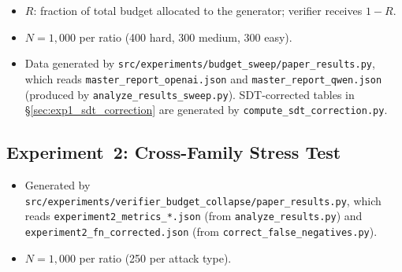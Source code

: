 \documentclass[12pt, a4paper, oneside]{report}
\begin{document}
\begin{itemize}
  \item $R$: fraction of total budget allocated to the generator; verifier
  receives $1-R$.
  \item $N=1{,}000$ per ratio (400 hard, 300 medium, 300 easy).
  \item Data generated by \texttt{src/experiments/budget\_sweep/paper\_results.py}, which reads \texttt{master\_report\_openai.json} and \texttt{master\_report\_qwen.json} (produced by \texttt{analyze\_results\_sweep.py}). SDT-corrected tables in \S\ref{sec:exp1_sdt_correction} are generated by \texttt{compute\_sdt\_correction.py}.
\end{itemize}

\begin{table}[p]
\centering
\footnotesize

\caption{Experiment~1 (symmetric sweep): per-ratio metrics for OpenAI
(gpt-4.1-mini) and Qwen (Qwen2.5-7B-Instruct). Total budgets:
easy=128, medium=192, hard=256 tokens.}
\label{tab:exp1_overview}
\end{table}

\begin{table}[p]
\centering
\footnotesize

\caption{Experiment~1: generator truncation breakdown. ``trunc gen'' is the
number of generator traces that were cut off mid-output; ``reject'' /
``accept'' / ``no verdict'' show how the verifier ruled on those stubs.}
\label{tab:exp1_trunc}
\end{table}

\begin{table}[p]
\centering
\footnotesize

\caption{Experiment~1: additional per-ratio metrics: process--outcome mismatch
rate (POM, the proportion of traces where the stated answer disagrees with the
reasoning), false-positive rate (FPR), false-negative rate (FNR), and
error-detection rate (EDR) on the complete-only subset.}
\label{tab:exp1_extra}
\end{table}


\subsection{Experiment~2: Cross-Family Stress Test}
\label{sec:tab-exp2}


\begin{itemize}
  \item Generated by \texttt{src/experiments/verifier\_budget\_collapse/paper\_results.py}, which reads \texttt{experiment2\_metrics\_*.json} (from \texttt{analyze\_results.py}) and \texttt{experiment2\_fn\_corrected.json} (from \texttt{correct\_false\_negatives.py}).
  \item $N=1{,}000$ per ratio (250 per attack type).
\end{itemize}
\end{document}
